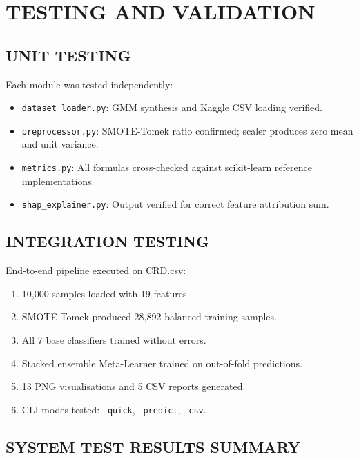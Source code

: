 \documentclass[12pt,a4paper,oneside]{report}
\begin{document}
\chapter{TESTING AND VALIDATION}

\section{UNIT TESTING}

Each module was tested independently:
\begin{itemize}[leftmargin=*, label=$\bullet$]
  \item \texttt{dataset\_loader.py}: GMM synthesis and Kaggle CSV loading verified.
  \item \texttt{preprocessor.py}: SMOTE-Tomek ratio confirmed; scaler produces zero mean and unit variance.
  \item \texttt{metrics.py}: All formulas cross-checked against scikit-learn reference implementations.
  \item \texttt{shap\_explainer.py}: Output verified for correct feature attribution sum.
\end{itemize}

\section{INTEGRATION TESTING}

End-to-end pipeline executed on CRD.csv:
\begin{enumerate}[leftmargin=*, label=\arabic*.]
  \item 10,000 samples loaded with 19 features.
  \item SMOTE-Tomek produced 28,892 balanced training samples.
  \item All 7 base classifiers trained without errors.
  \item Stacked ensemble Meta-Learner trained on out-of-fold predictions.
  \item 13 PNG visualisations and 5 CSV reports generated.
  \item CLI modes tested: \texttt{--quick}, \texttt{--predict}, \texttt{--csv}.
\end{enumerate}

\section{SYSTEM TEST RESULTS SUMMARY}
\end{document}
